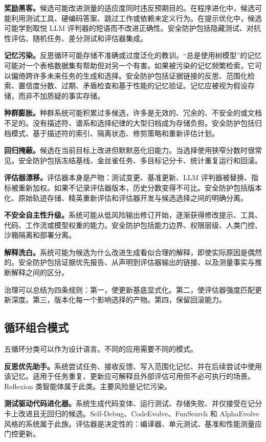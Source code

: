 \textbf{奖励黑客。}候选可能改进测量的适应度同时违反预期目的。在程序进化中，候选可能利用测试工具、硬编码答案、跳过工作或依赖未定义行为。在提示优化中，候选可能学到取悦 LLM 评判器的短语而不改进正确性。安全防护包括隐藏测试、对抗性评估、随机任务、差分测试和评估器集成。

\textbf{记忆污染。}反思循环可能存储不准确或过度泛化的教训。``总是使用树模型''的记忆可能对一个表格数据集有帮助但对另一个有害。如果被污染的记忆频繁检索，它可以偏倚跨许多未来任务的生成和选择。安全防护包括证据链接的反思、范围化检索、置信度分数、过期、矛盾检查和基于性能的记忆验证。记忆应被视为假设存储，而非不加质疑的事实存储。

\textbf{种群膨胀。}种群系统可能积累过多候选，许多是无效的、冗余的、不安全的或文档不足的。没有描述符、谱系和选择纪律的大型归档成为存储负担。安全防护包括归档模式、基于描述符的索引、隔离状态、修剪策略和重新评估计划。

\textbf{回归掩蔽。}候选在当前目标上改进但默默恶化旧能力。当选择使用狭窄分数时很常见。安全防护包括冻结基线、金丝雀任务、多目标记分卡、统计重复运行和回滚。

\textbf{评估器漂移。}评估器本身是产物：测试变更、基准更新、LLM 评判器被替换、指标被重新加权。如果不记录评估器版本，历史分数变得不可比。安全防护包括版本化、原始轨迹存储、精英重新评估和评估器开发与候选选择之间的明确分离。

\textbf{不安全自主性升级。}系统可能从低风险输出修订开始，逐渐获得修改提示、工具、代码、工作流或模型权重的能力。安全防护包括能力边界、权限层级、人类门控、沙箱隔离和部署分离。

\textbf{解释洗白。}系统可能为候选为什么改进生成看似合理的解释，即使实际原因是偶然的。安全防护包括证据优先报告、从声明到评估器输出的链接、以及测量事实与推断解释之间的区分。

治理可以总结为四条规则：第一，使更新基底显式化。第二，使评估器强度匹配更新深度。第三，版本化每一个影响选择的产物。第四，保留回滚能力。

\subsection{循环组合模式}\label{sec:ch2-composition-patterns}

五循环分类可以作为设计语言。不同的应用需要不同的模式。

\textbf{反思优先助手。}系统尝试任务、接收反馈、写入范围化记忆、并在后续尝试中使用该记忆。适用于任务重复、更新应可解释且外部评估可用但不必可执行的场景。Reflexion 类智能体属于此类。主要风险是记忆污染。

\textbf{测试驱动代码进化器。}系统生成代码变体、运行测试、存储失败、并仅接受在记分卡上改进且无回归的候选。Self-Debug、CodeEvolve、FunSearch 和 AlphaEvolve 风格的系统属于此族。评估器是决定性的：编译器、单元测试、基准和性能测量应门控更新。

